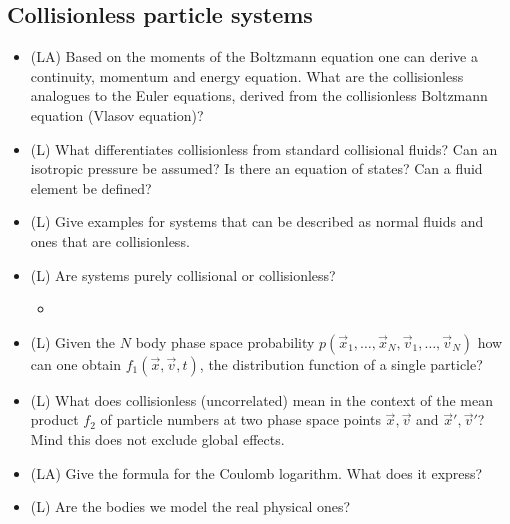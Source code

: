 \subsection*{Collisionless particle systems}

\begin{itemize}
    \item (LA) Based on the moments of the Boltzmann equation one can derive
    a continuity, momentum and energy equation. What are the collisionless analogues
    to the Euler equations, derived from the collisionless Boltzmann equation (Vlasov equation)?
    \item (L) What differentiates collisionless from standard collisional fluids? Can an isotropic
    pressure be assumed? Is there an equation of states? Can a fluid element be defined?
    \item (L) Give examples for systems that can be described as normal fluids and ones that are collisionless.
    \item (L) Are systems purely collisional or collisionless?
    \begin{itemize}
        \item {}
    \end{itemize}
    \item (L) Given the $N$ body phase space probability $p\left(\vec{x}_1, \ldots, \vec{x}_N, \vec{v}_1, \ldots, \vec{v}_N\right)$ how
    can one obtain $f_1(\vec{x}, \vec{v}, t)$, the distribution function of a single particle?
    \item (L) What does collisionless (uncorrelated) mean in the context of the mean product $f_2$ of particle numbers
    at two phase space points $\vec{x}, \vec{v}$ and $\vec{x}', \vec{v}'$? Mind this does not exclude global effects.
    \item (LA) Give the formula for the Coulomb logarithm. What does it express?
    \item (L) Are the bodies we model the real physical ones?

\end{itemize}
